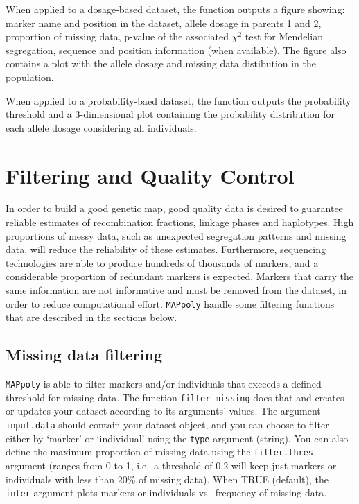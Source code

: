 \documentclass[
]{article}
\begin{document}
When applied to a dosage-based dataset, the function outputs a figure
showing: marker name and position in the dataset, allele dosage in
parents 1 and 2, proportion of missing data, p-value of the associated
\(\chi^2\) test for Mendelian segregation, sequence and position
information (when available). The figure also contains a plot with the
allele dosage and missing data distibution in the population.

When applied to a probability-baed dataset, the function outputs the
probability threshold and a 3-dimensional plot containing the
probability distribution for each allele dosage considering all
individuals.

\hypertarget{filtering-and-quality-control}{%
\section{Filtering and Quality
Control}\label{filtering-and-quality-control}}

In order to build a good genetic map, good quality data is desired to
guarantee reliable estimates of recombination fractions, linkage phases
and haplotypes. High proportions of messy data, such as unexpected
segregation patterns and missing data, will reduce the reliability of
these estimates. Furthermore, sequencing technologies are able to
produce hundreds of thousands of markers, and a considerable proportion
of redundant markers is expected. Markers that carry the same
information are not informative and must be removed from the dataset, in
order to reduce computational effort. \texttt{MAPpoly} handle some
filtering functions that are described in the sections below.

\hypertarget{missing-data-filtering}{%
\subsection{Missing data filtering}\label{missing-data-filtering}}

\texttt{MAPpoly} is able to filter markers and/or individuals that
exceeds a defined threshold for missing data. The function
\texttt{filter\_missing} does that and creates or updates your dataset
according to its arguments' values. The argument \texttt{input.data}
should contain your dataset object, and you can choose to filter either
by `marker' or `individual' using the \texttt{type} argument (string).
You can also define the maximum proportion of missing data using the
\texttt{filter.thres} argument (ranges from 0 to 1, i.e.~a threshold of
0.2 will keep just markers or individuals with less than 20\% of missing
data). When TRUE (default), the \texttt{inter} argument plots markers or
individuals vs.~frequency of missing data.
\end{document}
